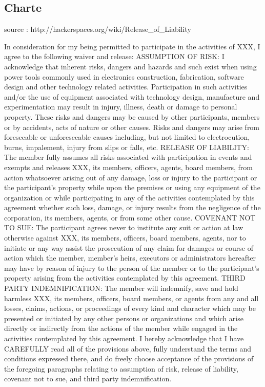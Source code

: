 \documentclass[a4paper]{article}
\begin{document}
        \subsection*{Charte} %

source : http://hackerspaces.org/wiki/Release_of_Liability

In consideration for my being permitted to participate in the activities of XXX, I agree to the following waiver and release:
ASSUMPTION OF RISK:  I acknowledge that inherent risks, dangers and hazards and such exist  when using power tools commonly used in electronics construction,  fabrication, software design and other technology related activities.  Participation in such activities and/or the use of equipment associated  with technology design, manufacture and experimentation may result in  injury, illness, death or damage to personal property. These risks and  dangers may be caused by other participants, members or by accidents,  acts of nature or other causes. Risks and dangers may arise from  foreseeable or unforeseeable causes including, but not limited to  electrocution, burns, impalement, injury from slips or falls, etc.
RELEASE OF LIABILITY:  The member fully assumes all risks associated with participation in  events and exempts and releases XXX, its members, officers, agents,  board members, from action whatsoever arising out of any damage, loss or  injury to the participant or the participant’s property while upon the  premises or using any equipment of the organization or while  participating in any of the activities contemplated by this agreement  whether such loss, damage, or injury results from the negligence of the  corporation, its members, agents, or from some other cause. 
COVENANT NOT TO SUE:  The participant agrees never to institute any suit or action at law  otherwise against XXX, its members, officers, board members, agents, nor  to initiate or any way assist the prosecution of any claim for damages  or course of action which the member, member’s heirs, executors or  administrators hereafter may have by reason of injury to the person of  the member or to the participant’s property arising from the activities  contemplated by this agreement.
THIRD PARTY INDEMNIFICATION:  The member will indemnify, save and hold harmless XXX, its members,  officers, board members, or agents from any and all losses, claims,  actions, or proceedings of every kind and character which may be  presented or initiated by any other persons or organizations and which  arise directly or indirectly from the actions of the member while  engaged in the activities contemplated by this agreement.
I  hereby acknowledge that I have CAREFULLY read all of the provisions  above, fully understand the terms and conditions expressed there, and do  freely choose acceptance of the provisions of the foregoing paragraphs  relating to assumption of risk, release of liability, covenant not to  sue, and third party indemnification.
\end{document}
